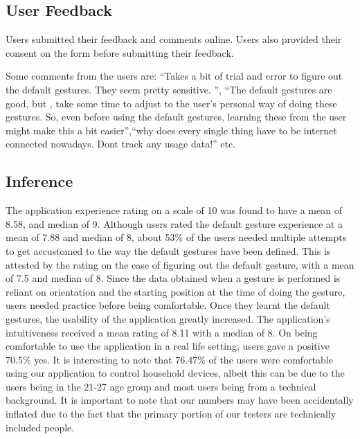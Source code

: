 \documentclass[journal]{IEEEtran}
\begin{document}
\subsection{User Feedback}

Users submitted their feedback and comments online. Users also provided their consent on the form before submitting their feedback.

Some comments from the users are: ``Takes a bit of trial and error to figure out the default gestures. They seem pretty sensitive. '', ``The default gestures are good, but , take some time to adjust to the user's personal way of doing these gestures. So, even before using the default gestures, learning  these from the user might make this a bit easier'',``why does every single thing have to be internet connected nowadays. Dont track any usage data!'' etc. 

\subsection{Inference}

The application experience rating on a scale of 10 was found to have a mean of 8.58,  and median of 9. Although users rated the default gesture experience at a mean of 7.88 and median of 8, about 53\% of the users needed multiple attempts to get accustomed to the way the default gestures have been defined. This is attested by the rating on the ease of figuring out the default gesture, with a mean of 7.5 and median of 8. Since the data obtained when a gesture is performed is reliant on orientation and the starting position at the time of doing the gesture, users needed practice before being comfortable. Once they learnt the default gestures, the usability of the application greatly increased. The application's intuitiveness received a mean rating of 8.11 with a median of 8. On being comfortable to use the application in a real life setting, users gave a positive 70.5\% yes. It is interesting to note that 76.47\% of the users were comfortable using our application to control household devices, albeit this can be due to the users being in the 21-27 age group and most users being from a technical background. It is important to note that our numbers may have been accidentally inflated due to the fact that the primary portion of our testers are technically included people. 
\end{document}
